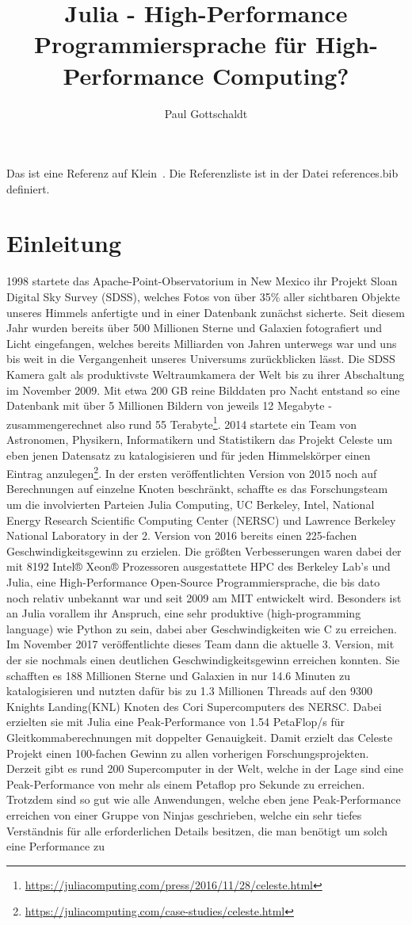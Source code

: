 \documentclass[proseminar,german,utf8]{zihpub}
\author{Paul Gottschaldt}
\title{Julia - High-Performance Programmiersprache für High-Performance Computing?}
\begin{document}
Das ist eine Referenz auf Klein~\cite{blackholes}. Die Referenzliste ist in der Datei references.bib definiert.

\section {Einleitung}
1998 startete das Apache-Point-Observatorium in New Mexico ihr Projekt Sloan Digital Sky Survey (SDSS), welches Fotos von über 35\% aller sichtbaren Objekte unseres Himmels anfertigte und in einer Datenbank zunächst sicherte. Seit diesem Jahr wurden bereits über 500 Millionen Sterne und Galaxien fotografiert und Licht eingefangen, welches bereits Milliarden von Jahren unterwegs war und uns bis weit in die Vergangenheit unseres Universums zurückblicken lässt. Die SDSS Kamera galt als produktivste Weltraumkamera der Welt bis zu ihrer Abschaltung im November 2009. Mit etwa 200 GB reine Bilddaten pro Nacht entstand so eine Datenbank mit über 5 Millionen Bildern von jeweils 12 Megabyte - zusammengerechnet also rund 55 Terabyte\footnote{\url{https://juliacomputing.com/press/2016/11/28/celeste.html}}. 2014 startete ein Team von Astronomen, Physikern, Informatikern und Statistikern das Projekt Celeste um eben jenen Datensatz zu katalogisieren und für jeden Himmelskörper einen Eintrag anzulegen\footnote{\url{https://juliacomputing.com/case-studies/celeste.html}}. In der ersten veröffentlichten Version von 2015 noch auf Berechnungen auf einzelne Knoten beschränkt, schaffte es das Forschungsteam um die involvierten Parteien Julia Computing, UC Berkeley, Intel, National Energy Research Scientific Computing Center (NERSC) und Lawrence Berkeley National Laboratory in der 2. Version von 2016 bereits einen 225-fachen Geschwindigkeitsgewinn zu erzielen. Die größten Verbesserungen waren dabei der mit 8192 Intel® Xeon® Prozessoren ausgestattete HPC des Berkeley Lab's und Julia, eine High-Performance Open-Source Programmiersprache, die bis dato noch relativ unbekannt war und seit 2009 am MIT entwickelt wird. Besonders ist an Julia vorallem ihr Anspruch, eine sehr produktive (high-programming language) wie Python zu sein, dabei aber Geschwindigkeiten wie C zu erreichen. Im November 2017 veröffentlichte dieses Team dann die aktuelle 3. Version, mit der sie nochmals einen deutlichen Geschwindigkeitsgewinn erreichen konnten. Sie schafften es 188 Millionen Sterne und Galaxien in nur 14.6 Minuten zu katalogisieren und nutzten dafür bis zu 1.3 Millionen Threads auf den 9300 Knights Landing(KNL) Knoten des Cori Supercomputers des NERSC. Dabei erzielten sie mit Julia eine Peak-Performance von 1.54 PetaFlop/s für Gleitkommaberechnungen mit doppelter Genauigkeit. Damit erzielt das Celeste Projekt einen 100-fachen Gewinn zu allen vorherigen Forschungsprojekten. Derzeit gibt es rund 200 Supercomputer in der Welt, welche in der Lage sind eine Peak-Performance von mehr als einem Petaflop pro Sekunde zu erreichen. Trotzdem sind so gut wie alle Anwendungen, welche eben jene Peak-Performance erreichen von einer Gruppe von Ninjas geschrieben, welche ein sehr tiefes Verständnis für alle erforderlichen Details besitzen, die man benötigt um solch eine Performance zu 
\end{document}
